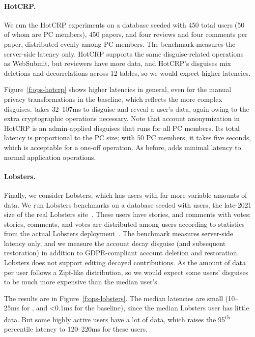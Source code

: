 \paragraph{HotCRP.}
%
We run the HotCRP experiments on a database seeded with 450 total users (50 of
whom are PC members), 450 papers, and four reviews and four comments per paper,
distributed evenly among PC members.
%
The benchmark measures the server-side latency only.
%
HotCRP supports the same disguise-related operations as WebSubmit, but reviewers
have more data, and HotCRP's disguises mix deletions and decorrelations across
12 tables, so we would expect higher latencies.
%

%
Figure~\ref{f:ops-hotcrp} shows higher latencies in general, even for the manual
privacy transformations in the baseline, which reflects the more complex
disguises.
%
\sys takes 32--107ms to disguise and reveal a user's data, again owing to the
extra cryptographic operations necessary.
%
Note that account anonymization in HotCRP is an admin-applied disguises that
runs for all PC members.
%
Its total latency is proportional to the PC size; \eg with 50 PC members, it takes
five seconds, which is acceptable for a one-off operation.
%
As before, \sys adds minimal latency to normal application operations.
%

\paragraph{Lobsters.}
%
Finally, we consider Lobsters, which has users with far more variable amounts of
data.
%
We run Lobsters benchmarks on a database seeded with  users, the
late-2021 size of the real Lobsters site~\cite{lobsters}.
%
These users have  stories, and  comments with votes;
stories, comments, and votes are distributed among users according to
statistics from the actual Lobsters deployment~\cite{lobsters-data}.
%
The benchmark measures server-side latency only, and we measure the account
decay disguise (and subsequent restoration) in addition to GDPR-compliant
account deletion and restoration.
%
Lobsters does not support editing decayed contributions.
%
As the amount of data per user follows a Zipf-like distribution, so we would
expect some users' disguises to be much more expensive than the median user's.
%

%
The results are in Figure~\ref{f:ops-lobsters}.
%
The median latencies are small (10--25ms for \sys, and <0.1ms for the
baseline), since the median Lobsters user has little data.
%
But some highly active users have a lot of data, which raises the
95\textsuperscript{th} percentile latency to 120--220ms for these users.
%

